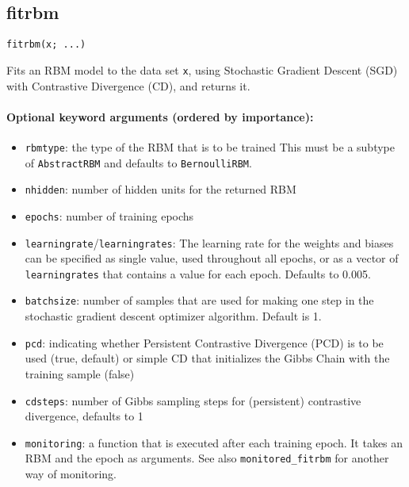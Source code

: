 \subsection*{fitrbm}  \label{bms_fitrbm}
\begin{verbatim}
fitrbm(x; ...)
\end{verbatim}
Fits an RBM model to the data set \texttt{x}, using Stochastic Gradient Descent (SGD) with Contrastive Divergence (CD), and returns it.

\paragraph*{Optional keyword arguments (ordered by importance):}
\begin{itemize}
\item \texttt{rbmtype}: the type of the RBM that is to be trained  This must be a subtype of \texttt{AbstractRBM} and defaults to \texttt{BernoulliRBM}.


\item \texttt{nhidden}: number of hidden units for the returned RBM


\item \texttt{epochs}: number of training epochs


\item \texttt{learningrate}/\texttt{learningrates}: The learning rate for the weights and biases  can be specified as single value, used throughout all epochs, or as a vector  of \texttt{learningrates} that contains a value for each epoch. Defaults to 0.005.


\item \texttt{batchsize}: number of samples that are used for making one step in the  stochastic gradient descent optimizer algorithm. Default is 1.


\item \texttt{pcd}: indicating whether Persistent Contrastive Divergence (PCD) is to  be used (true, default) or simple CD that initializes the Gibbs Chain with  the training sample (false)


\item \texttt{cdsteps}: number of Gibbs sampling steps for (persistent)  contrastive divergence, defaults to 1


\item \texttt{monitoring}: a function that is executed after each training epoch.  It takes an RBM and the epoch as arguments.  See also \texttt{monitored\_fitrbm} for another way of monitoring.



\end{itemize}
